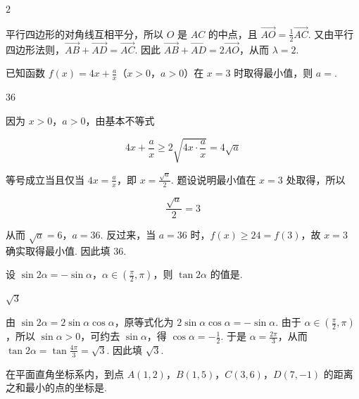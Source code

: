 \begin{answer}
\(2\)
\end{answer}

\begin{solution}
平行四边形的对角线互相平分，所以 \(O\) 是 \(AC\) 的中点，且 \(\overrightarrow{AO}=\frac12\overrightarrow{AC}\). 又由平行四边形法则，\(\overrightarrow{AB}+\overrightarrow{AD}=\overrightarrow{AC}\). 因此
\(\overrightarrow{AB}+\overrightarrow{AD}=2\overrightarrow{AO}\)，从而 \(\lambda=2\).
\end{solution}

\begin{problem}
已知函数 \(f(x)=4x+\frac{a}{x}\)（\(x>0\)，\(a>0\)）在 \(x=3\) 时取得最小值，则 \(a=\)\fillinblank{}.
\end{problem}

\begin{answer}
\(36\)
\end{answer}

\begin{solution}
因为 \(x>0\)，\(a>0\)，由基本不等式

\[
4x+\frac{a}{x}\geqslant 2\sqrt{4x\cdot\frac{a}{x}}=4\sqrt a
\]

等号成立当且仅当 \(4x=\frac{a}{x}\)，即 \(x=\frac{\sqrt a}{2}\). 题设说明最小值在 \(x=3\) 处取得，所以

\[
\frac{\sqrt a}{2}=3
\]

从而 \(\sqrt a=6\)，\(a=36\). 反过来，当 \(a=36\) 时，\(f(x)\geqslant24=f(3)\)，故 \(x=3\) 确实取得最小值. 因此填 \(36\).
\end{solution}

\begin{problem}
设 \(\sin 2\alpha=-\sin\alpha\)，\(\alpha\in\left(\frac{\pi}{2},\pi\right)\)，则 \(\tan 2\alpha\) 的值是\fillinblank{}.
\end{problem}

\begin{answer}
\(\sqrt{3}\)
\end{answer}

\begin{solution}
由 \(\sin2\alpha=2\sin\alpha\cos\alpha\)，原等式化为 \(2\sin\alpha\cos\alpha=-\sin\alpha\). 由于 \(\alpha\in\left(\frac\pi2,\pi\right)\)，所以 \(\sin\alpha>0\)，可约去 \(\sin\alpha\)，得 \(\cos\alpha=-\frac12\). 于是 \(\alpha=\frac{2\pi}{3}\)，从而
\(\tan2\alpha=\tan\frac{4\pi}{3}=\sqrt3\). 因此填 \(\sqrt3\).
\end{solution}

\begin{problem}
在平面直角坐标系内，到点 \(A(1,2)\)，\(B(1,5)\)，\(C(3,6)\)，\(D(7,-1)\) 的距离之和最小的点的坐标是\fillinblank{}.
\end{problem}


